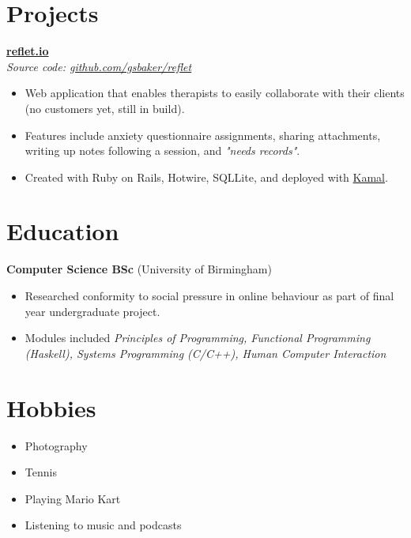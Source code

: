 \documentclass[letterpaper,11pt]{article}
\begin{document}
\section{Projects}

\textbf{\href{https://reflet.io}{reflet.io}} \\
\textit{Source code: \href{https://github.com/gsbaker/reflet}{github.com/gsbaker/reflet}} \\

\begin{itemize}[noitemsep]
\item Web application that enables therapists to easily collaborate with their clients (no customers yet, still in build).
\item Features include anxiety questionnaire assignments, sharing attachments, writing up notes following a session, and \textit{"needs records"}.
\item Created with Ruby on Rails, Hotwire, SQLLite, and deployed with \href{https://kamal-deploy.org}{Kamal}.
\end{itemize}


\section{Education}

\textbf{Computer Science BSc} (University of Birmingham) \\

\begin{itemize}[noitemsep]
\item Researched conformity to social pressure in online behaviour as part of final year undergraduate project.
\item Modules included \textit{Principles of Programming, Functional Programming (Haskell), Systems Programming (C/C++), Human Computer Interaction}
\end{itemize}

\section{Hobbies}

\begin{itemize}[noitemsep]
\item Photography
\item Tennis
\item Playing Mario Kart
\item Listening to music and podcasts
\end{itemize}

\end{document}
